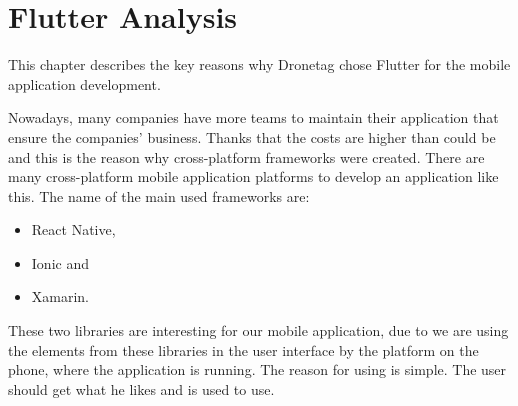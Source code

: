 \chapter{Flutter Analysis}\label{ch:flutter-analysis}

This chapter describes the key reasons why Dronetag chose Flutter for the mobile application development.

Nowadays, many companies have more teams to maintain their application that ensure the companies' business.
Thanks that the costs are higher than could be and this is the reason why cross-platform frameworks were created.
There are many cross-platform mobile application platforms to develop an application like this.
The name of the main used frameworks are:
\begin{itemize}
    \item React Native,
    \item Ionic and
    \item Xamarin.
\end{itemize}
















These two libraries are interesting for our mobile application, due to we are using the elements from these libraries in the user interface by the platform on the phone, where the application is running.
The reason for using is simple.
The user should get what he likes and is used to use.
